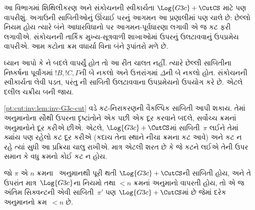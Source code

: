 આ વિભાગમાં શિથિલીકરણ અને સંકોચનની સ્વીકાર્યતા
$\Log{G3c}+\CutCS$ માટે પણ વાપરીશું. અગાઉની
સાબિતીઓનું ઊંચાઈ પરનું આગમન આ પ્રણાલીમાં પણ ચાલે છે:
છેલ્લો નિયમ \CutCS{} હોય ત્યારે બંને આધારવિધાનો પર
આગમન-પૂર્વધારણા લગાવી એ જ કટ ફરી લગાવીએ. સંકોચનની
તાર્કિક મુખ્ય-સૂત્રવાળી શાખાઓમાં ઉપરનું ઉલટાવવાનું
ઉપપ્રમેય વાપરીએ. આમ કટોના ક્રમ વધાર્યા વિના બંને
રૂપાંતરો મળે છે.

ધ્યાન આપો કે \CutCS{}ને બદલે \Cut{} વાપર્યું હોત
તો આ રીત ચાલત નહીં. ત્યારે છેલ્લી સાબિતીના
નિષ્કર્ષના પૂર્વાંગમાં $!B, !C, \Gamma$ની બે નકલો
અને ઉત્તરાંગમાં $\Delta$ની બે નકલો હોત.
સંકોચનની સ્વીકાર્યતા લેવી પડત, પરંતુ
ની સાબિતી
ઉલટાવવાના ઉપપ્રમેયનો ઉપયોગ કરે છે.
એટલે દલીલ ચક્રીય બની જાય.

\cref{pt:cut:inv:lem:inv-G3c-cut} વડે કટ-નિરાકરણની
વૈકલ્પિક સાબિતી આપી શકાય. તેમાં \CutCS{}
અનુમાનોના સૌથી ઉપરના દૃષ્ટાંતોને એક પછી એક
દૂર કરવાને બદલે, સર્વોચ્ચ ક્રમનાં \CutCS{}
અનુમાનોને દૂર કરીએ છીએ. એટલે,
$\Log{G3c} + \CutCS$માં સાબિતી~$\pi$ લઈને
તેમાં ક્યાંય પણ રહેલો કટ દૂર કરીએ
(કદાચ તેના સ્થાને નીચા ક્રમના કટ આવે)
અને કટ ન રહે ત્યાં સુધી આ પ્રક્રિયા ચાલુ રાખીએ.
માત્ર એટલી શરત છે કે જે કટને લઈએ તેની ઉપર
સમાન કે વધુ ક્રમનો કોઈ કટ ન હોય.

\begin{lem}
જો $\pi$ એ $n$ ક્રમના~\CutCS{} અનુમાનથી પૂરી થતી
$\Log{G3c}+\CutCS$ની સાબિતી હોય, અને તે ઉપરાંત
માત્ર~$\Log{G3c}$ના નિયમો તથા $<n$ ક્રમનાં
\CutCS{} અનુમાનો વાપરતી હોય, તો એ જ અંતિમ
સિક્વન્ટની એવી સાબિતી~$\pi'$ પણ
$\Log{G3c} + \CutCS$માં છે જેમાં દરેક
\CutCS{} અનુમાનનો ક્રમ~$<n$ છે.
\end{lem}

